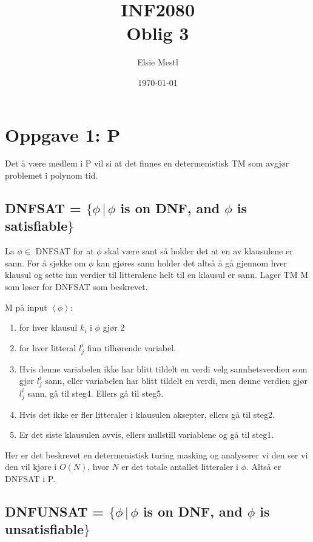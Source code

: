 \documentclass{article}
\title{INF2080\\Oblig 3}
\date{\today}
\author{Elsie Mestl}
\begin{document}
\maketitle



\section*{Oppgave 1: P}

Det å være medlem i P vil si at det finnes en determenistisk TM som avgjør problemet i polynom tid.

\subsection*{DNFSAT = $\{\phi \, |  \, \phi $ is on DNF, and $\phi$ is satisfiable$\}$}

La $\phi \in$ DNFSAT for at $\phi$ skal være sant så holder det at en av klausulene er sann. For å sjekke om $\phi$ kan gjøres sann holder det altså å gå gjennom hver klausul og sette inn verdier til litteralene helt til en klausul er sann. Lager TM M som løser for DNFSAT som beskrevet.

M på input $\left<\phi\right>$:
\begin{enumerate}
\item for hver klausul $k_i$ i $\phi$ gjør 2
\item for hver litteral $l_j^i$ finn tilhørende variabel.
\item Hvis denne variabelen ikke har blitt tildelt en verdi velg sannhetsverdien som gjør  $l_j^i$ sann, eller variabelen har blitt tildelt en verdi, men denne verdien gjør $l_j^i$ sann, gå til steg4. Ellers gå til steg5.
\item Hvis det ikke er fler litteraler i klausulen aksepter, ellers gå til steg2.
\item Er det siste klausulen avvis, ellers nullstill variablene og gå til steg1. 
\end{enumerate}

Her er det beskrevet en determenistisk turing masking og analyserer vi den ser vi den vil kjøre i $O(N)$, hvor $N$ er det totale antallet litteraler i $\phi$. Altså er DNFSAT i P. 




\subsection*{DNFUNSAT = $\{\phi \, |  \, \phi $ is on DNF, and $\phi$ is unsatisfiable$\}$}
\end{document}
